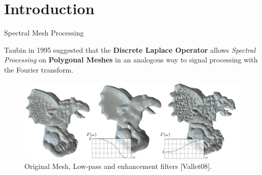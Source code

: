 \documentclass[10pt, compress, english]{beamer}
\begin{document}
\section{Introduction}
\begin{frame}{Spectral Mesh Processing}


Taubin in 1995 suggested that the\textbf{ Discrete Laplace Operator}
allows  \textit{Spectral Processing} on \textbf{Polygonal Meshes}
in an analogous way to signal processing with the Fourier transform.


\begin{center}
\begin{figure}
\includegraphics[width=1\textwidth]{img/Gargola_Smoothing_And_Enhance}

\protect\caption{Original Mesh, Low-pass and enhancement filters {[}Vallet08{]}.}
\end{figure}

\par\end{center}







\end{frame}
\end{document}
